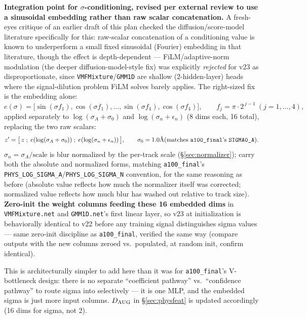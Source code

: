\documentclass[11pt]{article}
\newcommand{\code}[1]{\texttt{#1}}
\begin{document}
\textbf{Integration point for $\sigma$-conditioning, revised per external review to use a
sinusoidal embedding rather than raw scalar concatenation.} A fresh-eyes critique of an
earlier draft of this plan checked the diffusion/score-model literature specifically for
this: raw-scalar concatenation of a conditioning value is known to underperform a small
fixed sinusoidal (Fourier) embedding in that literature, though the effect is
depth-dependent --- FiLM/adaptive-norm modulation (the deeper diffusion-model-style fix) was
explicitly \emph{rejected} for v23 as disproportionate, since \code{VMFMixture}/\code{GMM1D}
are shallow (2-hidden-layer) heads where the signal-dilution problem FiLM solves barely
applies. The right-sized fix is the embedding alone:
\[
  e(\sigma) = \big[\sin(\sigma f_1), \cos(\sigma f_1), \dots, \sin(\sigma f_4), \cos(\sigma f_4)\big],
  \qquad f_j = \pi\!\cdot\!2^{\,j-1}\ (j=1,\dots,4),
\]
applied separately to $\log(\sigma_A+\sigma_0)$ and $\log(\sigma_n+\epsilon_n)$ (8 dims
each, 16 total), replacing the two raw scalars:
\[
  z' = \big[\,z \;;\; e(\log(\sigma_A+\sigma_0)) \;;\; e(\log(\sigma_n+\epsilon_n))\,\big],
  \qquad \sigma_0 = 1.0\text{\AA (matches \code{a100\_final}'s \code{SIGMA0\_A})}.
\]
$\sigma_n = \sigma_A/\text{scale}$ is blur normalized by the per-track scale
(\S\ref{sec:normalizer}); carry both the absolute and normalized forms, matching
\code{a100\_final}'s \code{PHYS\_LOG\_SIGMA\_A}/\code{PHYS\_LOG\_SIGMA\_N} convention, for the
same reasoning as before (absolute value reflects how much the normalizer itself was
corrected; normalized value reflects how much blur has washed out relative to track size).
\textbf{Zero-init the weight columns feeding these 16 embedded dims} in
\code{VMFMixture.net} and \code{GMM1D.net}'s first linear layer, so v23 at initialization is
behaviorally identical to v22 before any training signal distinguishes sigma values --- same
zero-init discipline as \code{a100\_final}, verified the same way (compare outputs with the
new columns zeroed vs.\ populated, at random init, confirm identical).

This is architecturally simpler to add here than it was for \code{a100\_final}'s
V-bottleneck design: there is no separate ``coefficient pathway'' vs.\ ``confidence
pathway'' to route sigma into selectively --- it is one MLP, and the embedded sigma is just
more input columns. $D_{\rm AUG}$ in \S\ref{sec:physfeat} is updated accordingly (16 dims
for sigma, not 2).
\end{document}
